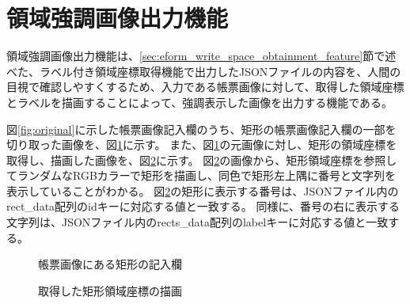 \section{領域強調画像出力機能}\label{sec:highlighted_area_image_output}
領域強調画像出力機能は、\ref{sec:eform_write_space_obtainment_feature}節で述べた、ラベル付き領域座標取得機能で出力したJSONファイルの内容を、人間の目視で確認しやすくするため、入力である帳票画像に対して、取得した領域座標とラベルを描画することによって、強調表示した画像を出力する機能である。

図\ref{fig:original}に示した帳票画像記入欄のうち、矩形の帳票画像記入欄の一部を切り取った画像を、図\ref{fig:rect_original}に示す。
また、図\ref{fig:rect_original}の元画像に対し、矩形の領域座標を取得し、描画した画像を、図\ref{fig:rect_drawing}に示す。
図\ref{fig:rect_drawing}の画像から、矩形領域座標を参照してランダムなRGBカラーで矩形を描画し、同色で矩形左上隅に番号と文字列を表示していることがわかる。
図\ref{fig:rect_drawing}の矩形に表示する番号は、JSONファイル内のrect\_data配列のidキーに対応する値と一致する。
同様に、番号の右に表示する文字列は、JSONファイル内のrects\_data配列のlabelキーに対応する値と一致する。

\begin{figure}[t]
    \begin{center}
        \caption{帳票画像にある矩形の記入欄}
        \label{fig:rect_original}
    \end{center}
\end{figure}

\begin{figure}[t]
    \begin{center}
        \caption{取得した矩形領域座標の描画}
        \label{fig:rect_drawing}
    \end{center}
\end{figure}

